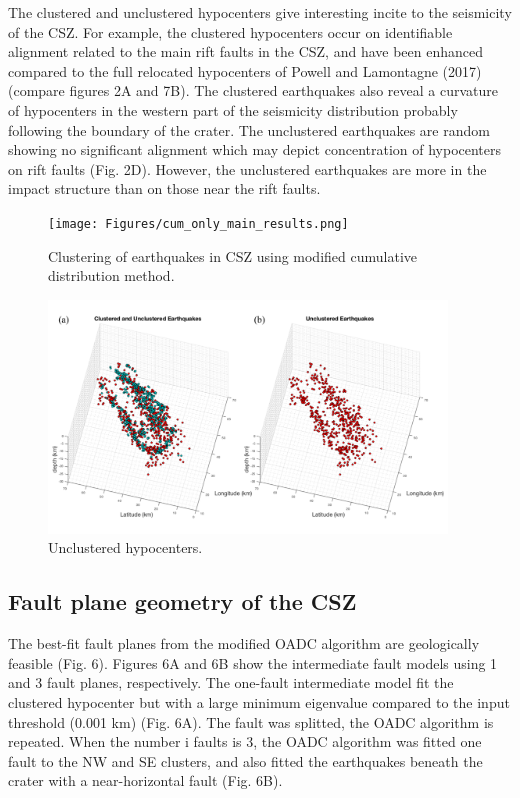 \documentclass[draft]{agujournal2018}
\begin{document}
The clustered and unclustered hypocenters give interesting incite to the seismicity of the CSZ. For example, the clustered hypocenters occur on identifiable alignment related to the main rift faults in the CSZ, and have been enhanced compared to the full relocated hypocenters of Powell and Lamontagne (2017) (compare figures 2A and 7B). The clustered earthquakes also reveal a curvature of hypocenters in the western part of the seismicity distribution probably following the boundary of the crater. The unclustered earthquakes are random showing no significant alignment which may depict concentration of hypocenters on rift faults (Fig. 2D). However, the unclustered earthquakes are more in the impact structure than on those near the rift faults.

\begin{figure}[ht]
\centering
\texttt{[image: Figures/cum\_only\_main\_results.png]}
\caption{Clustering of earthquakes in CSZ using modified cumulative distribution method.}
\label{figtwo}
\end{figure}

\begin{figure}[ht]
\centering
\includegraphics[width=25pc]{Figures/unclustered_cum_only_results.png}
\caption{Unclustered hypocenters.}
\label{figthree}
\end{figure}
  
 
\subsection{Fault plane geometry of the CSZ}
The best-fit fault planes from the modified OADC algorithm are geologically feasible (Fig. 6). Figures 6A and 6B show the intermediate fault models using 1 and 3 fault planes, respectively. The one-fault intermediate model fit the clustered hypocenter but with a large minimum eigenvalue compared to the input threshold (0.001 km) (Fig. 6A). The fault was splitted, the OADC algorithm is repeated. When the number i faults is 3, the OADC algorithm was fitted one fault to the NW and SE clusters, and also fitted the earthquakes beneath the crater with a near-horizontal fault (Fig. 6B). 
\end{document}

